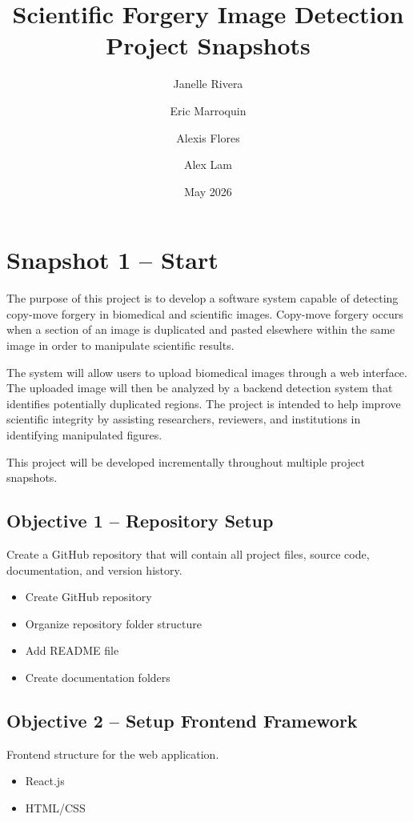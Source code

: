 \documentclass[12pt]{article}
\title{Scientific Forgery Image Detection\\Project Snapshots}
\author{Janelle Rivera \and Eric Marroquin \and Alexis Flores \and Alex Lam}
\date{May 2026}
\begin{document}
\maketitle

\tableofcontents
\newpage

\section{Snapshot 1 -- Start}

The purpose of this project is to develop a software system capable of detecting
copy-move forgery in biomedical and scientific images. Copy-move forgery occurs when
a section of an image is duplicated and pasted elsewhere within the same image in
order to manipulate scientific results.

The system will allow users to upload biomedical images through a web interface. The
uploaded image will then be analyzed by a backend detection system that identifies
potentially duplicated regions. The project is intended to help improve scientific integrity
by assisting researchers, reviewers, and institutions in identifying manipulated figures.

This project will be developed incrementally throughout multiple project snapshots.

\subsection{Objective 1 -- Repository Setup}

Create a GitHub repository that will contain all project files, source code,
documentation, and version history.

\begin{itemize}
    \item Create GitHub repository
    \item Organize repository folder structure
    \item Add README file
    \item Create documentation folders
\end{itemize}

\subsection{Objective 2 -- Setup Frontend Framework}

Frontend structure for the web application.

\begin{itemize}
    \item React.js
    \item HTML/CSS
\end{itemize}
\end{document}
